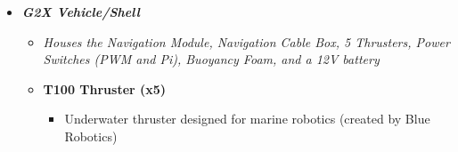 \documentclass[12pt]{article}
\begin{document}
{\begin{itemize}
\begin{itemize}
\begin{itemize}
						\item Wavelength: 1310nm
					\end{itemize}
					\item[] \textbf{4-Port Gb Switch}
					\begin{itemize}
						\item Allows different devices on a network to communicate
						\item 4 auto-sensing Gigabit Ethernet ports
						\item Non-blocking switching architecture
					\end{itemize}
					\item[] \textbf{Fiberoptic Tether}
					\begin{itemize}
						\item Provides Fiberoptic connection (2000 ft. of tether) to the Communicator on the Handling Gear
						\item Communicator provides media converter between Fiberoptic and Ethernet (external PC Ethernet connection) 
					\end{itemize}
					\item[] \textbf{Navigation Fiberoptic Cable Plugin}
					\begin{itemize}
						\item Provides the Fiberoptic cable plugin (user plugs in cable) between the communications module and navigation module
					\end{itemize}
					\item[] \textbf{Misc.}
					\begin{itemize}
						\item Pi Camera V2
						\item Realtime Clock (I2C)
						\item Power Supply (5V from fiber optic connection)\\\\
					\end{itemize}
				\end{itemize}
				\item \textbf{\textit{G2X Vehicle/Shell}}
				\begin{itemize}	
					\item[] \textit{Houses the Navigation Module, Navigation Cable Box, 5 Thrusters, Power Switches (PWM and Pi), Buoyancy Foam, and a 12V battery\\}
					\item[] \textbf{T100 Thruster (x5)}
					\begin{itemize}
						\item Underwater thruster designed for marine robotics (created by Blue Robotics)

\end{itemize}
\end{itemize}
\end{itemize}}
\end{document}
